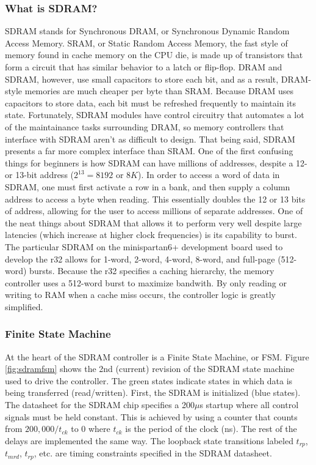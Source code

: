 \documentclass{article}
\begin{document}
\subsubsection{What is SDRAM?}
SDRAM stands for Synchronous DRAM, or Synchronous Dynamic Random Access Memory. SRAM, or Static Random Access Memory, the fast style of memory found in cache memory on the CPU die, is made up of transistors that form a circuit that has similar behavior to a latch or flip-flop. DRAM and SDRAM, however, use small capacitors to store each bit, and as a result, DRAM-style memories are much cheaper per byte than SRAM. Because DRAM uses capacitors to store data, each bit must be refreshed frequently to maintain its state. Fortunately, SDRAM modules have control circuitry that automates a lot of the maintainance tasks surrounding DRAM, so memory controllers that interface with SDRAM aren't as difficult to design. That being said, SDRAM presents a far more complex interface than SRAM. One of the first confusing things for beginners is how SDRAM can have millions of addresses, despite a 12- or 13-bit address ($2^{13} = 8192$ or $8K$). In order to access a word of data in SDRAM, one must first activate a row in a bank, and then supply a column address to access a byte when reading. This essentially doubles the 12 or 13 bits of address, allowing for the user to access millions of separate addresses. One of the neat things about SDRAM that allows it to perform very well despite large latencies (which increase at higher clock frequencies) is its capability to burst. The particular SDRAM on the minispartan6+ development board used to develop the r32 allows for 1-word, 2-word, 4-word, 8-word, and full-page (512-word) bursts. Because the r32 specifies a caching hierarchy, the memory controller uses a 512-word burst to maximize bandwith. By only reading or writing to RAM when a cache miss occurs, the controller logic is greatly simplified.

\subsubsection{Finite State Machine}
At the heart of the SDRAM controller is a Finite State Machine, or FSM. Figure \ref{fig:sdramfsm} shows the 2nd (current) revision of the SDRAM state machine used to drive the controller. The green states indicate states in which data is being transferred (read/written). First, the SDRAM is initialized (blue states). The datasheet for the SDRAM chip specifies a 200$\mu$s startup where all control signals must be held constant. This is achieved by using a counter that counts from $200,000 / t_{ck}$ to 0 where $t_{ck}$ is the period of the clock (ns). The rest of the delays are implemented the same way. The loopback state transitions labeled $t_{rp}$, $t_{mrd}$, $t_{rp}$, etc. are timing constraints specified in the SDRAM datasheet.
\end{document}

